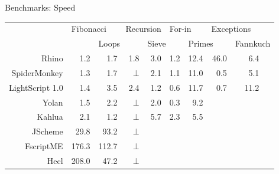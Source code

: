 \documentclass[a4paper,landscape]{slides}
\begin{document}
\begin{slide}
	{\large 
            Benchmarks: Speed
        }

        \begin{center} \begin{tabular}{|r|r|r|r|r|r|r|r|rr|} \hline
        & \multicolumn{2}{|l|}{Fibonacci} & \multicolumn{2}{|l|}{Recursion} & \multicolumn{2}{|l|}{For-in} & \multicolumn{2}{|l}{Exceptions} & \\
        & & \multicolumn{2}{|l|}{Loops} & \multicolumn{2}{|l|}{Sieve} & \multicolumn{2}{|l|}{Primes} & \multicolumn{2}{|l|}{Fannkuch} \\
        \hline Rhino       & 1.2 & 1.7 & 1.8   & 3.0 & 1.2 & 12.4 & 46.0 & 6.4 & \\
        \hline SpiderMonkey& 1.3 & 1.7 & $\bot$ & 2.1 & 1.1 & 11.0 & 0.5  & 5.1 & \\
        \hline LightScript 1.0 & 1.4 & 3.5 & 2.4   & 1.2 & 0.6 & 11.7 & 0.7  & 11.2 & \\
        \hline Yolan       & 1.5 & 2.2 & $\bot$ & 2.0 & 0.3 &  9.2 &  &  & \\
        \hline Kahlua      & 2.1 & 1.2 & $\bot$ &  5.7 & 2.3 & 5.5 &  &  & \\
        \hline JScheme    & 29.8 & 93.2 & $\bot$ & & & & & & \\
        \hline FscriptME & 176.3 & 112.7& $\bot$ & & & & & & \\
        \hline Hecl      & 208.0 & 47.2 & $\bot$ & & & & & & \\
        \hline \end{tabular}
        \end{center}

\end{slide}
\end{document}
